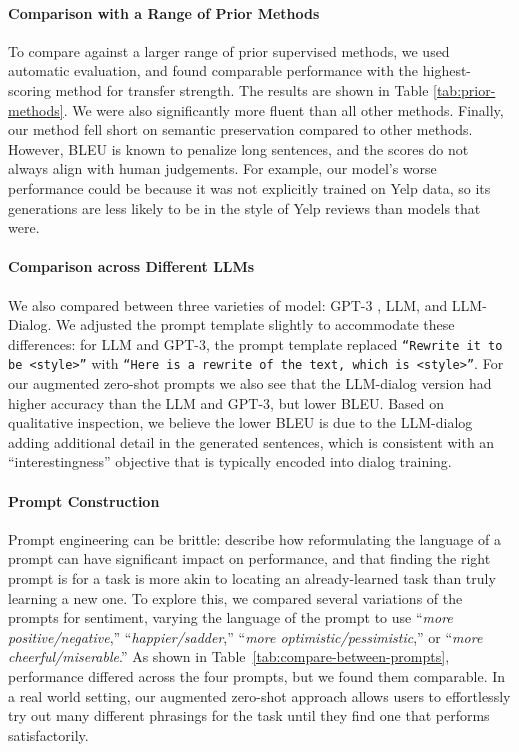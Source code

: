 

\paragraph{Comparison with a Range of Prior Methods}
To compare against a larger range of prior supervised methods, we used automatic evaluation, and found comparable performance with the highest-scoring method for transfer strength.
The results are shown in Table \ref{tab:prior-methods}.
We were also significantly more fluent than all other methods.
Finally, our method fell short on semantic preservation compared to other methods. However, BLEU is known to penalize long sentences, and the scores do not always align with human judgements.
For example, our model's worse performance could be because it was not explicitly trained on Yelp data, so its generations are less likely to be in the style of Yelp reviews than models that were.

\paragraph{Comparison across Different LLMs}
We also compared between three varieties of model: GPT-3 \citep{DBLP:journals/corr/abs-2005-14165}, LLM, and  LLM-Dialog. We adjusted the prompt template slightly to accommodate these differences: for  LLM and GPT-3, the prompt template replaced {\small
\texttt{``Rewrite it to be \textbf{<style>}''}
with \small \texttt{``Here is a rewrite of the text, which is \textbf{<style>}''}.}
For our augmented zero-shot prompts we also see that the LLM-dialog version had higher accuracy than the LLM and GPT-3, but lower BLEU. Based on qualitative inspection, we believe the lower BLEU is due to the LLM-dialog adding additional detail in the generated sentences, which is consistent with an ``interestingness'' objective that is typically encoded into dialog training. 


\paragraph{Prompt Construction}
\label{sec:prompt-selection}
Prompt engineering can be brittle: \citet{reynolds2021prompt} describe how reformulating the language of a prompt can have significant impact on performance, and that finding the right prompt is for a task is more akin to locating an already-learned task than truly learning a new one.
To explore this, we compared several variations of the prompts for sentiment, varying the language of the prompt to use ``\textit{more {positive/negative}},'' ``\textit{{happier/sadder}},''
``\textit{more {optimistic/pessimistic}},'' or
``\textit{more {cheerful/miserable}}.''
As shown in Table~\ref{tab:compare-between-prompts}, performance differed across the four prompts, but we found them comparable.
In a real world setting, our augmented zero-shot approach allows users to effortlessly try out many different phrasings for the task until they find one that performs satisfactorily.

